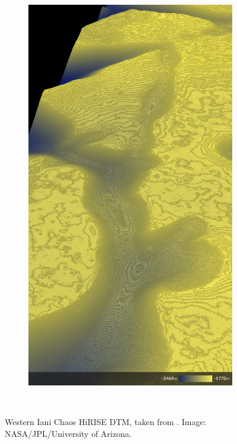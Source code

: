 \begin{figure}[h]
\begin{subfigure}[t]{\subfigureWidth}
        \label{fig:sub:western-iani-chaos-dtm}
    \end{subfigure}\hfill
    \begin{subfigure}[t]{\subfigureWidth}
        \centering
        \includegraphics[height=\graphicsHeight]{sections/mars-solar-energy/mission-sites/images/western-iani-chaos-dtm-altimetry.png}
		\label{fig:sub:western-iani-chaos-dtm-altimetry}
	\end{subfigure}\\[0.8ex]
    \caption[Western Iani Chaos \ac{HiRISE} \ac{DTM}]
            {Western Iani Chaos \ac{HiRISE} \ac{DTM}, taken from . Image: \ac{NASA}/\ac{JPL}/University of Arizona.}
    \label{fig:western-iani-chaos}
\vspace{-2ex}
\end{figure}

